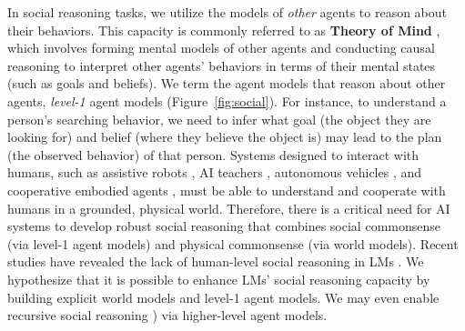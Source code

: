 \documentclass{article}
\begin{document}
In social reasoning tasks, we utilize the models of \textit{other} agents to reason about their behaviors. This capacity is commonly referred to as \textbf{Theory of Mind} \citep{premack1978does}, which involves forming mental models of other agents and conducting causal reasoning to interpret other agents' behaviors in terms of their mental states (such as goals and beliefs). We term the agent models that reason about other agents, {\it level-1} agent models (Figure~\ref{fig:social}). For instance, to understand a person's searching behavior, we need to infer what goal (the object they are looking for) and belief (where they believe the object is) may lead to the plan (the observed behavior) of that person. Systems designed to interact with humans, such as assistive robots \citep[e.g.,][]{dautenhahn2007socially, hadfield2016cooperative,patel2022proactive,puig2023nopa}, AI teachers \citep[e.g.,][]{wang2021towards}, autonomous vehicles \citep[e.g.,][]{chandra2020stylepredict}, and cooperative embodied agents \citep[e.g.,][]{bara2021mindcraft,pmlr-v162-sclar22a},  must be able to understand and cooperate with humans in a grounded, physical world. Therefore, there is a critical need for AI systems to develop robust social reasoning that combines social commonsense (via level-1 agent models) and physical commonsense (via world models). Recent studies have revealed the lack of human-level social reasoning in LMs \citep[e.g.,][]{sap2022neural, jin2023mmtom, ullman2023large, shapira2023clever,moghaddam2023boosting}. We hypothesize that it is possible to enhance LMs' social reasoning capacity by building explicit world models and level-1 agent models. We may even enable recursive social reasoning \citep[e.g.,][]{gmytrasiewicz2005framework,goodman2016pragmatic,hadfield2016cooperative,tejwani2022social,schulz2023emergent,jha2023neural}) via higher-level agent models. 
\end{document}
